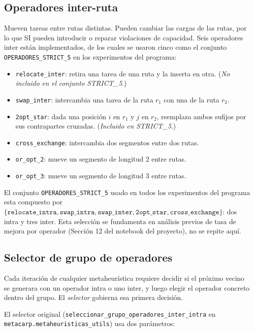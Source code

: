 \documentclass[11pt,a4paper]{article}
\theoremstyle{definition}
\theoremstyle{remark}
\begin{document}
\subsection{Operadores inter-ruta}

Mueven tareas entre rutas distintas. Pueden cambiar las cargas de las
rutas, por lo que SI pueden introducir o reparar violaciones de
capacidad. Seis operadores inter están implementados, de los cuales se
usaron cinco como el conjunto \texttt{OPERADORES\_STRICT\_5} en los
experimentos del programa:

\begin{itemize}
\item \texttt{relocate\_inter}: retira una tarea de una ruta y la
  inserta en otra. (\emph{No incluido en el conjunto STRICT\_5}.)
\item \texttt{swap\_inter}: intercambia una tarea de la ruta $r_1$ con
  una de la ruta $r_2$.
\item \texttt{2opt\_star}: dada una posición $i$ en $r_1$ y $j$ en $r_2$,
  reemplaza ambos sufijos por sus contrapartes cruzadas. (\emph{Incluido en STRICT\_5}.)
\item \texttt{cross\_exchange}: intercambia dos segmentos entre dos rutas.
\item \texttt{or\_opt\_2}: mueve un segmento de longitud 2 entre rutas.
\item \texttt{or\_opt\_3}: mueve un segmento de longitud 3 entre rutas.
\end{itemize}

El conjunto \texttt{OPERADORES\_STRICT\_5} usado en todos los
experimentos del programa esta compuesto por
$\{\texttt{relocate\_intra}, \texttt{swap\_intra},
\texttt{swap\_inter}, \texttt{2opt\_star}, \texttt{cross\_exchange}\}$:
dos intra y tres inter. Esta selección se fundamenta en análisis
previos de tasa de mejora por operador (Sección 12 del notebook del
proyecto), no se repite aquí.

\subsection{Selector de grupo de operadores}
\label{sec:selector}

Cada iteración de cualquier metaheurística requiere decidir si el
próximo vecino se generara con un operador intra o uno inter, y luego
elegir el operador concreto dentro del grupo. El \emph{selector}
gobierna esa primera decisión.

El selector original (\texttt{seleccionar\_grupo\_operadores\_inter\_intra}
en \texttt{metacarp.metaheuristicas\_utils}) usa dos parámetros:
\end{document}
